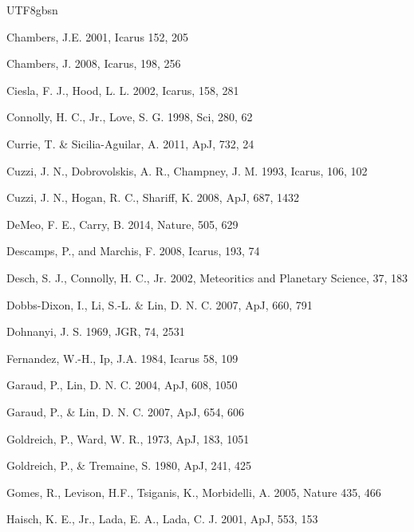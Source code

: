 \documentclass[tighten]{aastex6}
\begin{document}
\begin{CJK*}{UTF8}{gbsn}
\begin{thebibliography}{}
 Chambers, J.E. 2001, Icarus 152, 205

 Chambers, J. 2008, Icarus, 198, 256

 Ciesla, F. J., Hood, L. L. 
2002, Icarus, 158, 281

 Connolly, H. C., Jr., 
Love, S. G. 1998, Sci, 280, 62

 Currie, T. \& Sicilia-Aguilar, A. 2011, ApJ, 732, 24 


 Cuzzi, J. N., Dobrovolskis, A. R., Champney, J. M. 1993, Icarus, 106, 102

 Cuzzi, J. N., Hogan, R. C., 
Shariff, K. 2008, ApJ, 687, 1432

 DeMeo, F. E., Carry, B. 2014, Nature, 505, 629

 Descamps, P., and Marchis, F.  2008,  Icarus, 193, 74

 Desch, S. J., Connolly, 
H. C., Jr. 2002, Meteoritics and Planetary Science, 37, 183

 Dobbs-Dixon, I., Li, S.-L. \& Lin, D. N. C. 2007, ApJ, 660, 791

 Dohnanyi, J. S. 1969, JGR, 74, 2531

 Fernandez, W.-H., Ip, J.A. 1984, Icarus 58, 109

 Garaud, P., Lin, D. N. C. 2004, ApJ, 608, 1050

 Garaud, P., \& Lin, D. N. C. 2007, ApJ, 654, 606

 Goldreich, P., Ward, W. R., 1973, ApJ, 183, 1051

 Goldreich, P., \& Tremaine, S. 1980, ApJ, 241, 425

 Gomes, R., Levison, H.F., Tsiganis, K., Morbidelli, A. 2005, Nature 435, 466

 Haisch, K. E., Jr., Lada, E. A., Lada, C. J. 2001, ApJ, 553, 153


\end{thebibliography}
\end{CJK*}
\end{document}
